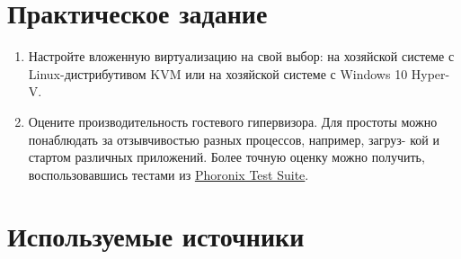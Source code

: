 \documentclass[14pt, a4paper]{article}
\begin{document}
\section*{Практическое задание} 

\begin{enumerate}
    \item Настройте вложенную виртуализацию на свой выбор: на хозяйской системе с
    Linux-дистрибутивом KVM или на хозяйской системе с Windows 10 Hyper-V.
    \item Оцените производительность гостевого гипервизора. Для простоты можно понаблюдать за
    отзывчивостью разных процессов, например, загруз- кой и стартом различных приложений.
    Более точную оценку можно получить, воспользовавшись тестами из \href{https://www.phoronix-test-suite.com/}{Phoronix Test Suite}.
\end{enumerate}

\section*{Используемые источники} 
\end{document}
